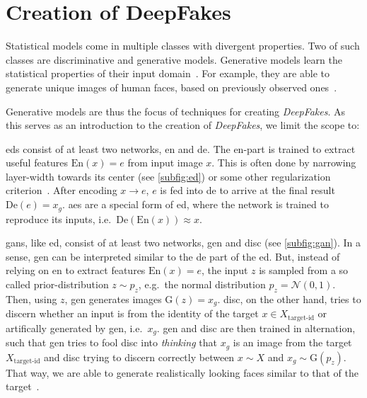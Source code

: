 \section{Creation of DeepFakes}\label{sect:creation-of-deepfakes}
Statistical models come in multiple classes with divergent properties.
Two of such classes are discriminative and generative models. Generative models
learn the statistical properties of their input domain~\cite[cf.][\nopp{}651\psqq]{Goodfellow.2016}.
For example, they are able to generate unique images of human faces, based on
previously observed ones~\cite{Karras.2019}.

\par
Generative models are thus the focus of techniques for creating \textit{DeepFakes}. As
this serves as an introduction to the creation of \textit{DeepFakes}, we limit the scope
to:
\begin{description}[leftmargin=0cm]
    \item[\glspl{ed}] \glspl{ed} consist of at least two networks, \gls{en} and
    \gls{de}. The \gls{en}-part is trained to extract
    useful features \(\text{En}(x)=e\) from input image \(x\). This is often
    done by narrowing layer-width towards its center (see \cref{subfig:ed}) or
    some other regularization criterion~\cite[cf.][499-505]{Goodfellow.2016}.
    After encoding \(x \rightarrow e\), \(e\) is fed into \gls{de} to arrive at
    the final result \(\text{De}(e)=x_g\). \Glspl{ae} are a special form of
    \gls{ed}, where the network is trained to reproduce its inputs, i.e.\
    \(\text{De}(\text{En}(x))\approx x\).

    \item[\glspl{gan}] \glspl{gan}, like \gls{ed}, consist of at least two networks,
    \gls{gen} and \gls{disc} (see \cref{subfig:gan}). In a sense, \gls{gen} can
    be interpreted similar to the \gls{de} part of the \gls{ed}. But, instead of
    relying on \gls{en} to extract features \(\text{En}(x)=e\), the input
    \(z\) is sampled from a so called prior-distribution \(z\sim p_z\), e.g.\
    the normal distribution \(p_z=\mathcal{N}(0, 1)\). Then, using \(z\),
    \gls{gen} generates images \(\text{G}(z)=x_g\). \Gls{disc}, on the other hand,
    tries to discern whether an input is from the identity of the target
    \(x\in X_{\text{target-id}}\) or artifically generated by \gls{gen}, i.e.\ \(x_g\).
    \Gls{gen} and \gls{disc} are then trained in alternation, such that \gls{gen}
    tries to fool \gls{disc} into \textit{thinking} that \(x_g\) is an image from the
    target \(X_{\text{target-id}}\) and \gls{disc} trying to discern correctly
    between \(x\sim X\) and \(x_g\sim \text{G}(p_z)\). That way, we are able to
    generate realistically looking faces similar to that of the target~\cite{Goodfellow.2014}.
\end{description}
